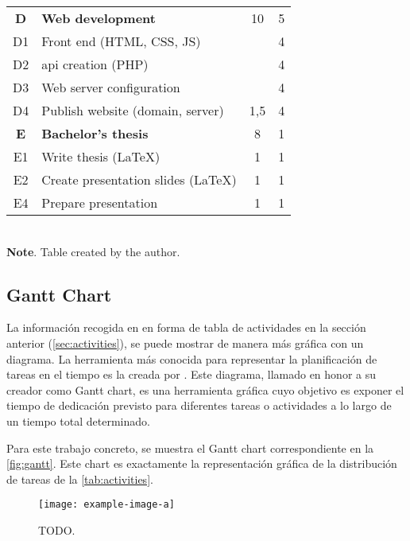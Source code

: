 \begin{table}[p]
\begin{tabular}{cp{}cc}
    \textbf{D} & \textbf{Web development}         & 10  & 5 \\
    D1         & Front end (HTML, CSS, JS)        &     & 4 \\
    D2         & \Acs{api} creation  (PHP)        &     & 4 \\
    D3         & Web server configuration         &     & 4 \\
    D4         & Publish website (domain, server) & 1,5 & 4 \\
    \midrule

    \rowcolor{rowColor}
    \textbf{E} & \textbf{Bachelor's thesis} & 8 & 1 \\
    \rowcolor{rowColor}
    E1         & Write thesis (\LaTeX)       & 1 & 1 \\
    \rowcolor{rowColor}
    \rowcolor{rowColor}
    E2         & Create presentation slides (\LaTeX) & 1 & 1 \\
    \rowcolor{rowColor}
    E4         & Prepare presentation       & 1 & 1 \\
    \bottomrule
  \end{tabular} \\[1.25ex]
  {\small\textbf{Note}. Table created by the author.}
\end{table}


\subsection{Gantt Chart}\label{sec:gantt}

La información recogida en en forma de tabla de actividades en la sección
anterior (\vref{sec:activities}), se puede mostrar de manera más gráfica con un
diagrama. La herramienta más conocida para representar la planificación de
tareas en el tiempo es la creada por
. Este diagrama, llamado en
honor a su creador como Gantt chart, es una herramienta gráfica cuyo objetivo
es exponer el tiempo de dedicación previsto para diferentes tareas o
actividades a lo largo de un tiempo total determinado.

Para este trabajo concreto, se muestra el Gantt chart correspondiente en la
\vref{fig:gantt}. Este chart es exactamente la representación gráfica de la
distribución de tareas de la \vref{tab:activities}.

\begin{figure}[p]
    \centering
    \texttt{[image: example-image-a]}
    \caption[TODO]{TODO.}\label{fig:gantt}
\end{figure}



